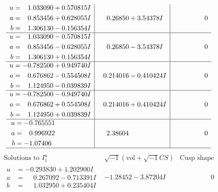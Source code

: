 \documentclass[1p]{elsarticle_modified}
\theoremstyle{definition}
\newcommand{\I}{\sqrt{-1}}
\begin{document}
$$\begin{array}{c|c|c}
\begin{aligned}
u &= \phantom{-}1.033090 + 0.570815 I \\
a &= \phantom{-}0.853456 + 0.628055 I \\
b &= \phantom{-}1.306130 - 0.156354 I\end{aligned}
 & \phantom{-}0.26850 + 3.54378 I & \phantom{-0.000000 } 0 \\ \hline\begin{aligned}
u &= \phantom{-}1.033090 - 0.570815 I \\
a &= \phantom{-}0.853456 - 0.628055 I \\
b &= \phantom{-}1.306130 + 0.156354 I\end{aligned}
 & \phantom{-}0.26850 - 3.54378 I & \phantom{-0.000000 } 0 \\ \hline\begin{aligned}
u &= -0.782500 + 0.949740 I \\
a &= \phantom{-}0.676862 - 0.554508 I \\
b &= \phantom{-}1.124950 - 0.039839 I\end{aligned}
 & \phantom{-}0.214016 - 0.410424 I & \phantom{-0.000000 } 0 \\ \hline\begin{aligned}
u &= -0.782500 - 0.949740 I \\
a &= \phantom{-}0.676862 + 0.554508 I \\
b &= \phantom{-}1.124950 + 0.039839 I\end{aligned}
 & \phantom{-}0.214016 + 0.410424 I & \phantom{-0.000000 } 0 \\ \hline\begin{aligned}
u &= -0.765551\phantom{ +0.000000I} \\
a &= \phantom{-}0.996922\phantom{ +0.000000I} \\
b &= -1.07406\phantom{ +0.000000I}\end{aligned}
 & \phantom{-}2.38604\phantom{ +0.000000I} & \phantom{-0.000000 } 0\\
 \hline 
 \end{array}$$\newpage$$\begin{array}{c|c|c}  
\text{Solutions to }I^u_{1}& \I (\text{vol} + \sqrt{-1}CS) & \text{Cusp shape}\\
 \hline 
\begin{aligned}
u &= -0.293830 + 1.202900 I \\
a &= \phantom{-}0.267092 - 0.713391 I \\
b &= \phantom{-}1.032950 + 0.235404 I\end{aligned}
 & -1.28452 - 3.87204 I & \phantom{-0.000000 } 0 \\ \hline\begin{aligned}

\end{aligned}
\end{array}$$
\end{document}
